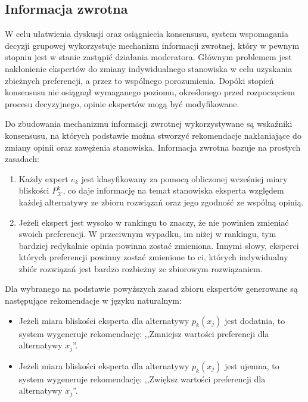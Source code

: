 \subsection{Informacja zwrotna}
W celu ułatwienia dyskusji oraz osiągniecia konsensusu, system wspomagania
decyzji grupowej wykorzystuje mechanizm informacji zwrotnej, który w pewnym
stopniu jest w stanie zastąpić działania moderatora. Głównym problemem jest
nakłonienie ekspertów do zmiany indywidualnego stanowiska w celu uzyskania
zbieżnych preferencji, a przez to wspólnego porozumienia. Dopóki stopień
konsensusu nie osiągnął wymaganego poziomu, określonego przed rozpoczęciem
procesu decyzyjnego, opinie ekspertów mogą być modyfikowane.

Do zbudowania mechanizmu informacji zwrotnej wykorzystywane są wskaźniki
konsensusu, na których podstawie można stworzyć rekomendacje nakłaniające do
zmiany opinii oraz zawężenia stanowiska. Informacja zwrotna bazuje na prostych
zasadach:
\begin{enumerate}
  \item Każdy expert $e_k$ jest klasyfikowany za pomocą obliczonej wcześniej
  miary bliskości $P^k_{\mathcal{X}}$, co daje informację na temat stanowiska
  eksperta względem każdej alternatywy ze zbioru rozwiązań oraz jego zgodność ze
  wspólną opinią.
  \item Jeżeli ekspert jest wysoko w rankingu to znaczy, że nie powinien
  zmieniać swoich preferencji. W przeciwnym wypadku, im niżej w rankingu, tym
  bardziej redykalnie opinia powinna zostać zmieniona. Innymi słowy, eksperci
  których preferencji powinny zostać zmienione to ci, których indywidualny zbiór
  rozwiązań jest bardzo rozbieżny ze zbiorowym rozwiązaniem.
\end{enumerate}
Dla wybranego na podstawie powyższych zasad zbioru ekspertów generowane są
następujące rekomendacje w języku naturalnym:
\begin{itemize}
  \item Jeżeli miara bliskości eksperta dla alternatywy $p_k(x_j)$ jest
  dodatnia, to system wygeneruje rekomendację: ,,Zmniejsz wartości preferencji
  dla alternatywy $x_j$''.
  \item Jeżeli miara bliskości eksperta dla alternatywy $p_k(x_j)$ jest ujemna,
  to system wygeneruje rekomendację: ,,Zwiększ wartości preferencji dla
  alternatywy $x_j$''.
\end{itemize}
